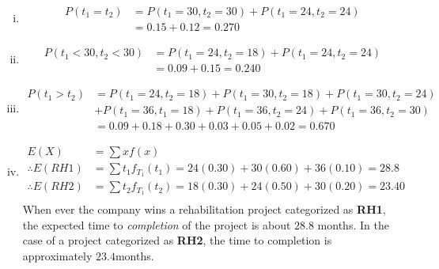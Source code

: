 \documentclass[12pt,a4paper, fleq]{article}
\begin{document}
\begin{enumerate}[i.]
\item
\[
\begin{split}
P(t_1 =t_2) &= P(t_1 = 30, t_2 =30) + P(t_1 = 24, t_2 = 24)\\
&  = 0.15+0.12 = \mathbf{0.270}
\end{split}
\]
\item
\[
\begin{split}
P(t_1 < 30, t_2 <30) &= P(t_1 = 24, t_2 =18) + P(t_1 = 24, t_2 = 24)\\
& = 0.09 + 0.15 = \mathbf{0.240}
\end{split}
\]
\item
\[
\begin{split}
P(t_1 > t_2) &= P(t_1 = 24, t_2 =18) + P(t_1 = 30, t_2 = 18) + P(t_1 =30, t_2 = 24)\\
& + P(t_1 = 36, t_1 = 18) + P(t_1 = 36, t_2 =24) + P(t_1 =36, t_2 = 30)\\
& =0.09+0.18+0.30+0.03+0.05+0.02= \mathbf{0.670}
\end{split}
\]
\item
\[
\begin{split}
E(X) &= \sum xf(x)\\
\therefore E(RH1) &= \sum t_1f_{T_1}(t_1) = 24(0.30) + 30(0.60) + 36(0.10) = \mathbf{28.8}\\
\therefore E(RH2) &= \sum t_2f_{T_1}(t_2) = 18(0.30) + 24(0.50) + 30(0.20) = \mathbf{23.40}\\
\end{split}
\]
When ever the company wins a rehabilitation project categorized as {\bf RH1}, the expected time to {\em completion} of the project is about $28.8$  months. In the case of a project categorized as {\bf RH2}, the time to completion is approximately $23.4$months.
\end{enumerate}
\end{document}
